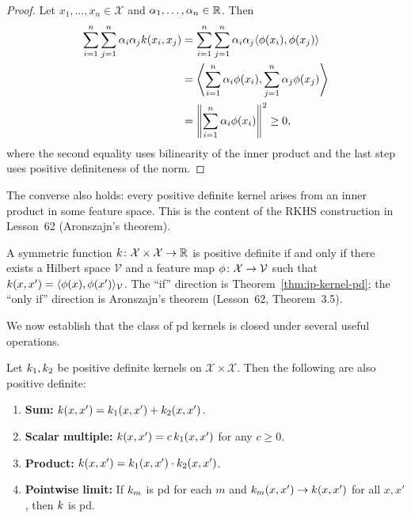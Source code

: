 \documentclass[11pt,a4paper]{article}
\begin{document}
\begin{proof}
Let $x_1, \ldots, x_n \in \mathcal{X}$ and $\alpha_1, \ldots,
\alpha_n \in \mathbb{R}$. Then
\begin{align*}
\sum_{i=1}^n \sum_{j=1}^n \alpha_i \alpha_j k(x_i, x_j)
&= \sum_{i=1}^n \sum_{j=1}^n \alpha_i \alpha_j
   \langle \phi(x_i), \phi(x_j) \rangle \\
&= \left\langle \sum_{i=1}^n \alpha_i \phi(x_i),
   \sum_{j=1}^n \alpha_j \phi(x_j) \right\rangle \\
&= \left\| \sum_{i=1}^n \alpha_i \phi(x_i) \right\|^2 \ge 0,
\end{align*}
where the second equality uses bilinearity of the inner product and
the last step uses positive definiteness of the norm.
\end{proof}

The converse also holds: every positive definite kernel arises from
an inner product in some feature space. This is the content of the
RKHS construction in Lesson~62 (Aronszajn's theorem).

\begin{keyresult}[title={Characterization of Positive Definite Kernels}]
A symmetric function $k \colon \mathcal{X} \times \mathcal{X}
\to \mathbb{R}$ is positive definite if and only if there exists a Hilbert
space $\mathcal{V}$ and a feature map $\phi \colon \mathcal{X}
\to \mathcal{V}$ such that $k(x, x') = \langle \phi(x),
\phi(x') \rangle_{\mathcal{V}}$. The ``if'' direction is
Theorem~\ref{thm:ip-kernel-pd}; the ``only if'' direction is
Aronszajn's theorem (Lesson~62, Theorem~3.5).
\end{keyresult}

We now establish that the class of pd kernels is closed under
several useful operations.

\begin{theorem}
\label{thm:pd-closure}
Let $k_1, k_2$ be positive definite kernels on
$\mathcal{X} \times \mathcal{X}$. Then the following are also
positive definite:
\begin{enumerate}[label=(\roman*)]
    \item \textbf{Sum:} $k(x, x') = k_1(x, x') +
    k_2(x, x')$.
    \item \textbf{Scalar multiple:} $k(x, x') = c \,
    k_1(x, x')$ for any $c \ge 0$.
    \item \textbf{Product:} $k(x, x') = k_1(x, x')
    \cdot k_2(x, x')$.
    \item \textbf{Pointwise limit:} If $k_m$ is pd for each
    $m$ and $k_m(x, x') \to k(x, x')$ for all $x, x'$,
    then $k$ is pd.
\end{enumerate}
\end{theorem}
\end{document}
